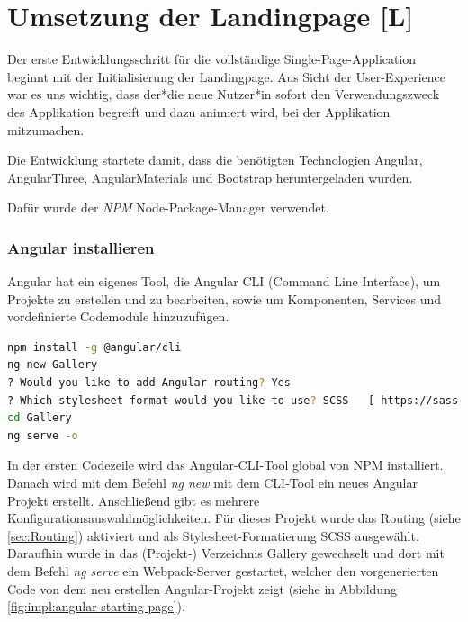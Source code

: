 \section{Umsetzung der Landingpage [L]}
\label{landingpage implentation}

Der erste Entwicklungsschritt für die vollständige Single-Page-Application beginnt mit der Initialisierung der Landingpage. Aus Sicht der User-Experience war es uns wichtig, dass der*die neue Nutzer*in sofort den Verwendungszweck des Applikation begreift und dazu animiert wird, bei der Applikation mitzumachen. 

Die Entwicklung startete damit, dass die benötigten Technologien Angular, AngularThree, AngularMaterials und Bootstrap heruntergeladen wurden.

Dafür wurde der \emph{NPM} Node-Package-Manager verwendet.

\subsubsection{Angular installieren}\label{sec:AngularCLI}
Angular hat ein eigenes Tool, die Angular CLI (Command Line Interface), um Projekte zu erstellen und zu bearbeiten, sowie um Komponenten, Services und vordefinierte Codemodule hinzuzufügen.

\begin{lstlisting}[caption={{Terminalm - Angular aufsetzen, Installation der CLI, Configuration eines neuen Projektes, Starten des Projektes}},language=bash]
npm install -g @angular/cli 
ng new Gallery
? Would you like to add Angular routing? Yes
? Which stylesheet format would you like to use? SCSS   [ https://sass-lang.com/documentation/syntax#scss ]
cd Gallery
ng serve -o
\end{lstlisting}

In der ersten Codezeile wird das Angular-CLI-Tool global von NPM installiert.
Danach wird mit dem Befehl \emph{ng new} mit dem CLI-Tool ein neues Angular Projekt erstellt. Anschließend gibt es mehrere Konfigurationsauswahlmöglichkeiten. Für dieses Projekt wurde das Routing (siehe \ref{sec:Routing}) aktiviert und als Stylesheet-Formatierung SCSS ausgewählt. Daraufhin wurde in das (Projekt-) Verzeichnis Gallery gewechselt und dort mit dem Befehl \emph{ng serve} ein Webpack-Server gestartet, welcher den vorgenerierten Code von dem neu erstellen Angular-Projekt zeigt (siehe in Abbildung \ref{fig:impl:angular-starting-page}). 

